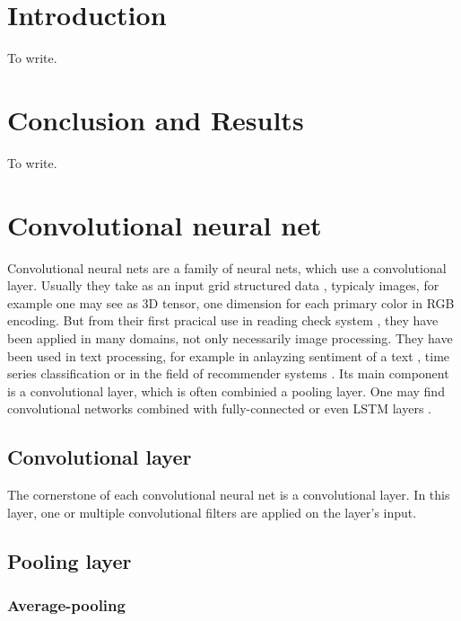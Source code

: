 \documentclass[twoside]{ctuthesis}
\theoremstyle{plain}
\theoremstyle{definition}
\theoremstyle{note}
\begin{document}
\maketitle

\chapter{Introduction}
To write.







\chapter{Conclusion and Results}
To write.

\appendix

\chapter{Convolutional neural net}
Convolutional neural nets are a family of neural nets, which use a convolutional layer.
Usually they take as an input grid structured data \cite{DL_BOOK}, typicaly images, for example
 one may see as 3D tensor, one dimension for each primary color in RGB encoding. But from their
 first pracical use in reading check system \cite{CHECKS}, they have been applied in many 
 domains, not only necessarily image processing. They have been used in text processing, for
 example in anlayzing sentiment of a text \cite{SENTIMENT_CNN}, time series classification 
\cite{TS_CNN} or in the field of recommender systems \cite{REC_CNN}. Its main component is a
convolutional layer, which is often combinied a pooling layer. One may find convolutional 
networks combined with fully-connected or even LSTM layers \cite{LSTM_CNN}.


\section{Convolutional layer}
The cornerstone of each convolutional neural net is a convolutional layer. In this layer, 
one or multiple convolutional filters are applied on the layer's input. 

\section{Pooling layer}

\subsection{Average-pooling}
\end{document}
